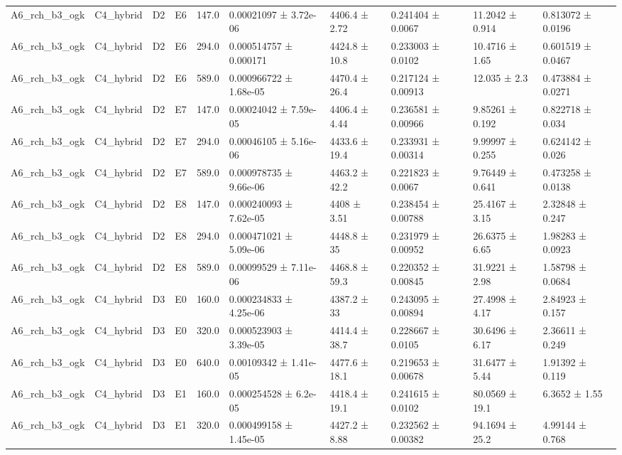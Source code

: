 \begin{table}
\begin{tabular}{llllllllll}
A6\_rch\_b3\_ogk & C4\_hybrid & D2 & E6 & 147.0 & 0.00021097 ± 3.72e-06 & 4406.4 ± 2.72 & 0.241404 ± 0.0067 & 11.2042 ± 0.914 & 0.813072 ± 0.0196 \\
A6\_rch\_b3\_ogk & C4\_hybrid & D2 & E6 & 294.0 & 0.000514757 ± 0.000171 & 4424.8 ± 10.8 & 0.233003 ± 0.0102 & 10.4716 ± 1.65 & 0.601519 ± 0.0467 \\
A6\_rch\_b3\_ogk & C4\_hybrid & D2 & E6 & 589.0 & 0.000966722 ± 1.68e-05 & 4470.4 ± 26.4 & 0.217124 ± 0.00913 & 12.035 ± 2.3 & 0.473884 ± 0.0271 \\
A6\_rch\_b3\_ogk & C4\_hybrid & D2 & E7 & 147.0 & 0.00024042 ± 7.59e-05 & 4406.4 ± 4.44 & 0.236581 ± 0.00966 & 9.85261 ± 0.192 & 0.822718 ± 0.034 \\
A6\_rch\_b3\_ogk & C4\_hybrid & D2 & E7 & 294.0 & 0.00046105 ± 5.16e-06 & 4433.6 ± 19.4 & 0.233931 ± 0.00314 & 9.99997 ± 0.255 & 0.624142 ± 0.026 \\
A6\_rch\_b3\_ogk & C4\_hybrid & D2 & E7 & 589.0 & 0.000978735 ± 9.66e-06 & 4463.2 ± 42.2 & 0.221823 ± 0.0067 & 9.76449 ± 0.641 & 0.473258 ± 0.0138 \\
A6\_rch\_b3\_ogk & C4\_hybrid & D2 & E8 & 147.0 & 0.000240093 ± 7.62e-05 & 4408 ± 3.51 & 0.238454 ± 0.00788 & 25.4167 ± 3.15 & 2.32848 ± 0.247 \\
A6\_rch\_b3\_ogk & C4\_hybrid & D2 & E8 & 294.0 & 0.000471021 ± 5.09e-06 & 4448.8 ± 35 & 0.231979 ± 0.00952 & 26.6375 ± 6.65 & 1.98283 ± 0.0923 \\
A6\_rch\_b3\_ogk & C4\_hybrid & D2 & E8 & 589.0 & 0.00099529 ± 7.11e-06 & 4468.8 ± 59.3 & 0.220352 ± 0.00845 & 31.9221 ± 2.98 & 1.58798 ± 0.0684 \\
A6\_rch\_b3\_ogk & C4\_hybrid & D3 & E0 & 160.0 & 0.000234833 ± 4.25e-06 & 4387.2 ± 33 & 0.243095 ± 0.00894 & 27.4998 ± 4.17 & 2.84923 ± 0.157 \\
A6\_rch\_b3\_ogk & C4\_hybrid & D3 & E0 & 320.0 & 0.000523903 ± 3.39e-05 & 4414.4 ± 38.7 & 0.228667 ± 0.0105 & 30.6496 ± 6.17 & 2.36611 ± 0.249 \\
A6\_rch\_b3\_ogk & C4\_hybrid & D3 & E0 & 640.0 & 0.00109342 ± 1.41e-05 & 4477.6 ± 18.1 & 0.219653 ± 0.00678 & 31.6477 ± 5.44 & 1.91392 ± 0.119 \\
A6\_rch\_b3\_ogk & C4\_hybrid & D3 & E1 & 160.0 & 0.000254528 ± 6.2e-05 & 4418.4 ± 19.1 & 0.241615 ± 0.0102 & 80.0569 ± 19.1 & 6.3652 ± 1.55 \\
A6\_rch\_b3\_ogk & C4\_hybrid & D3 & E1 & 320.0 & 0.000499158 ± 1.45e-05 & 4427.2 ± 8.88 & 0.232562 ± 0.00382 & 94.1694 ± 25.2 & 4.99144 ± 0.768 \\

\end{tabular}
\end{table}
